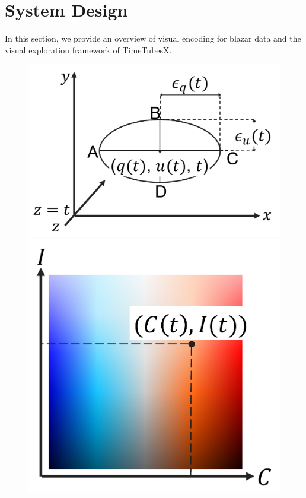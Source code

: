 \section{System Design\label{sec:systemDesign}}
In this section, we provide an overview of visual encoding for blazar data and the visual exploration framework of TimeTubesX.

\begin{figure}[tb]
    \begin{minipage}{0.34\linewidth}
        \centering
        \includegraphics[width=.99\linewidth]{vgtc_journal_latex/figures/howtoplot.pdf}
    \end{minipage}
    \begin{minipage}{0.26\linewidth}
        \centering
        \includegraphics[width=.99\linewidth]{vgtc_journal_latex/figures/colormap.pdf}

\end{minipage}
\end{figure}
